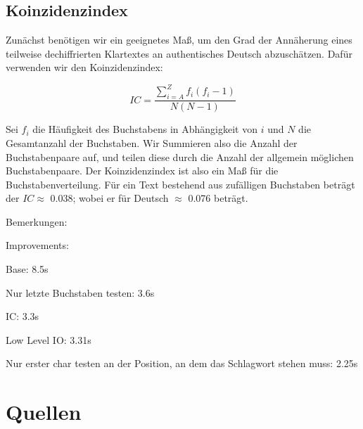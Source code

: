 \documentclass[ngerman, a4paper, footsepline, headsepline, numbers=noenddot]{scrreport}
\begin{document}
	\section{Koinzidenzindex}
	\thispagestyle{scrheadings}
	
	Zunächst benötigen wir ein geeignetes Maß, um den Grad der Annäherung eines teilweise dechiffrierten Klartextes an authentisches Deutsch abzuschätzen. Dafür verwenden wir den Koinzidenzindex:
	
	$$
	IC = \frac{\sum_{i=A}^{Z}f_i(f_i-1)}{N(N-1)}
	$$
	
	Sei $f_i$ die Häufigkeit des Buchstabens in Abhängigkeit von $i$ und $N$ die Gesamtanzahl der Buchstaben. Wir Summieren also die Anzahl der Buchstabenpaare auf, und teilen diese durch die Anzahl der allgemein möglichen Buchstabenpaare. Der Koinzidenzindex ist also ein Maß für die Buchstabenverteilung. Für ein Text bestehend aus zufälligen Buchstaben beträgt der $IC \approx$ 0.038; wobei er für Deutsch $\approx$ 0.076 beträgt.
	\newpage
	
	Bemerkungen:
	
	Improvements:
	
	Base: 8.5s
	
	Nur letzte Buchstaben testen: 3.6s
	
	IC: 3.3s
	
	Low Level IO: 3.31s
	
	Nur erster char testen an der Position, an dem das Schlagwort stehen muss: 2.25s 
	
	
	\chapter{Quellen}
	
	
	
	
	
	
\end{document}
